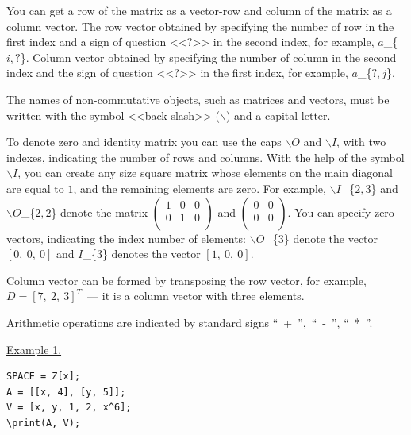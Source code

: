 You can get a row of the matrix as a vector-row and column of the matrix as a column vector. The row vector obtained by specifying the number of row in the first index and a  sign of question <<?>> in the second index, for example, $a$\_\{$i, ?$\}. Column vector obtained by specifying the number of column in the second index and the  sign of question <<?>> in the first index, for example, $a$\_\{$?, j$\}.
 
The names of non-commutative objects, such as matrices and vectors, must be written with the symbol <<back slash>> ($\backslash$) and a capital letter.


To denote zero and identity matrix you can 
use the caps $\backslash O$ and $\backslash I$, with two indexes, 
indicating the number of 
rows and columns. With the help of the symbol $\backslash I $, you can create any size square matrix whose elements on the 
main diagonal are equal to $ 1 $, and the remaining elements are zero. For example, $\backslash I$\_\{$2, 3$\} and $\backslash O$\_\{$2, 2$\} denote the matrix 
$ \left(\begin {array} {ccc}
1 & 0 & 0 \\ 0 & 1 & 0 \\ 
\end {array} \right) $ 
and $ \left(\begin {array} {cc}
0 & 0 \\ 0 & 0 \\ \end {array} \right) $. You can specify zero vectors, indicating the index number of elements: $\backslash O$\_\{$3$\} denote the vector $ [0, \ 0, \ 0] $ and $I$\_\{$3$\}   denotes the vector $ [ 1, \ 0, \ 0] $.

Column vector can be formed by transposing the row vector, for example, $ D = [7, \ 2, \ 3] ^ T $~--- it is a column vector with three elements.
 
Arithmetic operations are indicated by standard signs ``~+~'',~``~-~'', ``~*~''.

\smallskip

\underline{Example 1. }
\begin{verbatim}
SPACE = Z[x];
A = [[x, 4], [y, 5]];
V = [x, y, 1, 2, x^6];
\print(A, V);
\end{verbatim}



